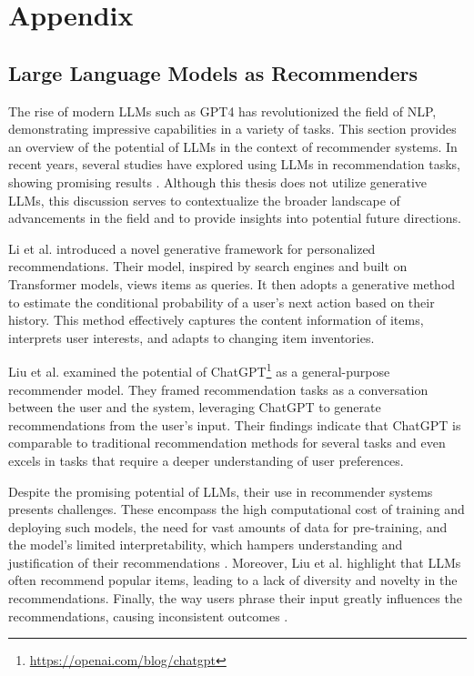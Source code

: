 \chapter*{Appendix} \label{sec:appendix}

\section*{Large Language Models as Recommenders} \label{sec:large-language-models-as-recommenders}

The rise of modern \ac{LLMs} such as GPT4 \cite{OpenAIGPT4Technical2023} has revolutionized the field of \ac{NLP}, demonstrating impressive capabilities in a variety of tasks.
This section provides an overview of the potential of \ac{LLMs} in the context of recommender systems.
In recent years, several studies have explored using \ac{LLMs} in recommendation tasks, showing promising results \cite{ZhangLanguageModels2021, HouLargeLanguage2023, LiGPT4RecGenerative2023}.
Although this thesis does not utilize generative \ac{LLMs}, this discussion serves to contextualize the broader landscape of advancements in the field and to provide insights into potential future directions.

Li et al. \cite{LiGPT4RecGenerative2023} introduced a novel generative framework for personalized recommendations. Their model, inspired by search engines and built on Transformer models, views items as queries. It then adopts a generative method to estimate the conditional probability of a user's next action based on their history. This method effectively captures the content information of items, interprets user interests, and adapts to changing item inventories.

Liu et al. \cite{LiuChatGPTGood2023} examined the potential of ChatGPT\footnote{\url{https://openai.com/blog/chatgpt}} as a general-purpose recommender model. They framed recommendation tasks as a conversation between the user and the system, leveraging ChatGPT to generate recommendations from the user's input. Their findings indicate that ChatGPT is comparable to traditional recommendation methods for several tasks and even excels in tasks that require a deeper understanding of user preferences.

Despite the promising potential of \ac{LLMs}, their use in recommender systems presents challenges. These encompass the high computational cost of training and deploying such models, the need for vast amounts of data for pre-training, and the model's limited interpretability, which hampers understanding and justification of their recommendations \cite{LinHowCan2023, LiuPretrainPrompt2023}. Moreover, Liu et al. \cite{LiuChatGPTGood2023} highlight that \ac{LLMs} often recommend popular items, leading to a lack of diversity and novelty in the recommendations. Finally, the way users phrase their input greatly influences the recommendations, causing inconsistent outcomes \cite{ZhangLanguageModels2021}.


